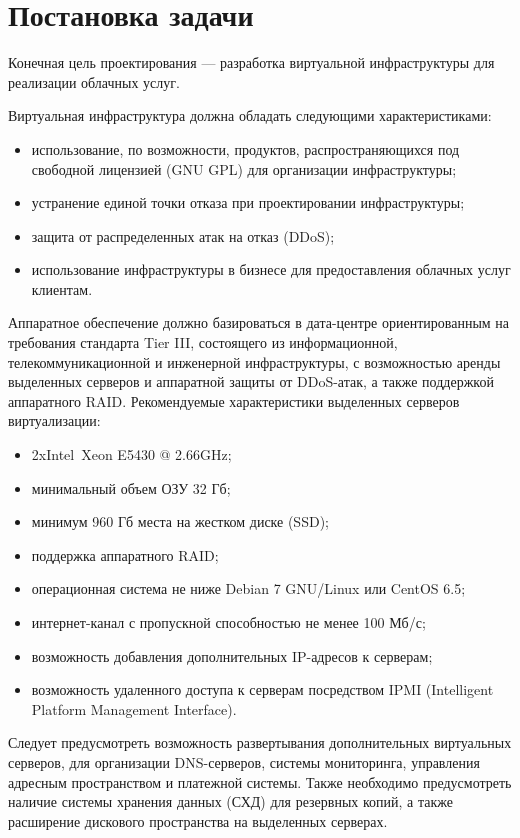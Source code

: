 \section{Постановка задачи}

Конечная цель проектирования --- разработка виртуальной инфраструктуры для реализации облачных услуг.

Виртуальная инфраструктура должна обладать следующими характеристиками:
\begin{itemize}
    \item использование, по возможности, продуктов, распространяющихся под свободной лицензией (GNU GPL) для организации инфраструктуры;
    \item устранение единой точки отказа при проектировании инфраструктуры;
    \item защита от распределенных атак на отказ (DDoS);
    \item использование инфраструктуры в бизнесе для предоставления облачных услуг клиентам.
\end{itemize}

Аппаратное обеспечение должно базироваться в дата-центре ориентированным на требования стандарта Tier III, состоящего из информационной, телекоммуникационной и инженерной инфраструктуры, с возможностью аренды выделенных серверов и аппаратной защиты от DDoS-атак, а также поддержкой аппаратного RAID.
Рекомендуемые характеристики выделенных серверов виртуализации:
\begin{itemize}
    \item 2xIntel\textregistered~Xeon E5430 @ 2.66GHz;
    \item минимальный объем ОЗУ 32 Гб;
    \item минимум 960 Гб места на жестком диске (SSD);
    \item поддержка аппаратного RAID;
    \item операционная система не ниже Debian 7 GNU/Linux или CentOS 6.5;
    \item интернет-канал с пропускной способностью не менее 100 Мб/с;
    \item возможность добавления дополнительных IP-адресов к серверам;
    \item возможность удаленного доступа к серверам посредством IPMI (Intelligent Platform Management Interface).
\end{itemize}

Следует предусмотреть возможность развертывания дополнительных виртуальных серверов, для организации DNS-серверов, системы мониторинга, управления адресным пространством и  платежной системы.
Также необходимо предусмотреть наличие системы хранения данных (СХД) для резервных копий, а также расширение дискового пространства на выделенных серверах.

